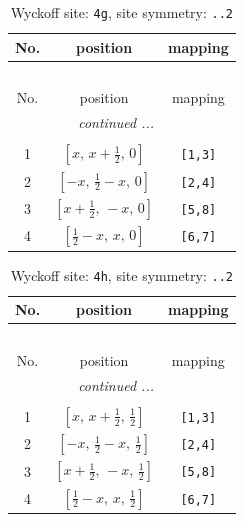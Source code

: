 \documentclass[fleqn,8pt]{jsarticle}
\begin{document}
\renewcommand{\arraystretch}{1.2}
\begin{longtable}{ccc}
\caption{Wyckoff site: {\tt 4g}, site symmetry: {\tt ..2}}
 \\
 \hline \hline
No. & position & mapping \\ \hline \endfirsthead

\multicolumn{2}{l}{\tablename\ \thetable{}} \\
 \hline \hline
No. & position & mapping \\ \hline \endhead

 \hline \hline
\multicolumn{2}{r}{\footnotesize\it continued ...} \\ \endfoot

 \hline \hline
\multicolumn{2}{r}{} \\ \endlastfoot

1 & $\left[ x,\, x + \frac{1}{2},\, 0 \right]$ & {\tt [1,3]} \\ \hline
2 & $\left[ - x,\, \frac{1}{2} - x,\, 0 \right]$ & {\tt [2,4]} \\ \hline
3 & $\left[ x + \frac{1}{2},\, - x,\, 0 \right]$ & {\tt [5,8]} \\ \hline
4 & $\left[ \frac{1}{2} - x,\, x,\, 0 \right]$ & {\tt [6,7]} \\
\end{longtable}
\renewcommand{\arraystretch}{1.2}
\begin{longtable}{ccc}
\caption{Wyckoff site: {\tt 4h}, site symmetry: {\tt ..2}}
 \\
 \hline \hline
No. & position & mapping \\ \hline \endfirsthead

\multicolumn{2}{l}{\tablename\ \thetable{}} \\
 \hline \hline
No. & position & mapping \\ \hline \endhead

 \hline \hline
\multicolumn{2}{r}{\footnotesize\it continued ...} \\ \endfoot

 \hline \hline
\multicolumn{2}{r}{} \\ \endlastfoot

1 & $\left[ x,\, x + \frac{1}{2},\, \frac{1}{2} \right]$ & {\tt [1,3]} \\ \hline
2 & $\left[ - x,\, \frac{1}{2} - x,\, \frac{1}{2} \right]$ & {\tt [2,4]} \\ \hline
3 & $\left[ x + \frac{1}{2},\, - x,\, \frac{1}{2} \right]$ & {\tt [5,8]} \\ \hline
4 & $\left[ \frac{1}{2} - x,\, x,\, \frac{1}{2} \right]$ & {\tt [6,7]} \\
\end{longtable}
\end{document}
